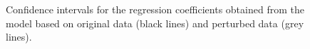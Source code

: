 \documentclass[12pt]{article}
\begin{document}
\begin{figure}[ht]
 \centering
 \caption[]{%
   \label{fig:ci}Confidence intervals for the regression coefficients obtained
  from the model based on original data (black lines) and perturbed data (grey
  lines).}
\end{figure}




%
%
\end{document}
